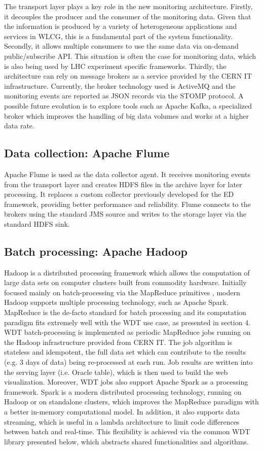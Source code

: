 The transport layer plays a key role in the new monitoring architecture.
Firstly, it decouples the producer and the consumer of the monitoring data.
Given that the information is produced by a variety of heterogeneous
applications and services in WLCG, this is a fundamental part of the system
functionality. Secondly, it allows multiple consumers to use the same data via
on-demand public/subscribe API. This situation is often the case for monitoring
data, which is also being used by LHC experiment specific frameworks. Thirdly,
the architecture can rely on message brokers as a service provided by the CERN
IT infrastructure. Currently, the broker technology used is ActiveMQ and the
monitoring events are reported as JSON records via the STOMP protocol.  A
possible future evolution is to explore tools such as Apache Kafka, a
specialized broker which improves the handling of big data volumes and works at
a higher data rate.

\subsection{Data collection: Apache Flume}

Apache Flume is used as the data collector agent. It receives monitoring events
from the transport layer and creates HDFS files in the archive layer for later
processing. It replaces a custom collector previously developed for the ED
framework, providing better performance and reliability. Flume connects to the
brokers using the standard JMS source and writes to the storage layer via the
standard HDFS sink.

\subsection{Batch processing: Apache Hadoop}

Hadoop is a distributed processing framework which allows the computation of
large data sets on computer clusters built from commodity hardware. Initially
focused mainly on batch-processing via the MapReduce primitives
\cite{mrgoogle}, modern Hadoop supports multiple processing technology, such as
Apache Spark.  MapReduce is the de-facto standard for batch processing and its
computation paradigm fits extremely well with the WDT use case, as presented in
section 4.  WDT batch-processing is implemented as periodic MapReduce jobs
running on the Hadoop infrastructure provided from CERN IT. The job algorithm
is stateless and idempotent, the full data set which can contribute to the
results (e.g. 3 days of data) being re-processed at each run. Job results are
written into the serving layer (i.e. Oracle table), which is then used to build
the web visualization. Moreover, WDT jobs also support Apache Spark
\cite{spark} as a processing framework. Spark is a modern distributed processing
technology, running on Hadoop or on standalone clusters, which improves the
MapReduce paradigm with a better in-memory computational model. In addition, it
also supports data streaming, which is useful in a lambda architecture to limit
code differences between batch and real-time. This flexibility is achieved via
the common WDT library presented below, which abstracts shared functionalities
and algorithms.


